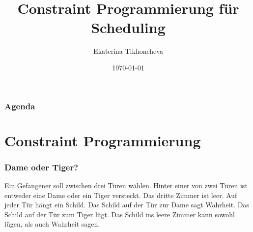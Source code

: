 \documentclass[hyperref={pdfpagelabels=false}]{beamer}
\title{Constraint Programmierung für Scheduling}
\author{Ekaterina Tikhoncheva}
\date{\today}
\newcommand{\inhalt}{\frame{   \frametitle{Überblick}   \tableofcontents[currentsection]}}
\begin{document}
\begin{frame}
\titlepage
\end{frame}
\begin{frame}
\frametitle{Agenda}
\tableofcontents
\end{frame} 


\section{Constraint Programmierung}
\inhalt

\begin{frame}
\frametitle{Dame oder Tiger?}
\small
\pause
Ein Gefangener soll zwischen {\color{darkred} drei Türen} wählen. Hinter einer von zwei Türen ist entweder {\color{darkred} eine Dame} oder {\color{darkred}ein Tiger} versteckt. Das dritte Zimmer ist {\color{darkred}leer}. Auf jeder Tür hängt ein Schild. Das Schild auf der Tür zur Dame sagt Wahrheit. Das Schild auf der Tür zum Tiger lügt. Das Schild ins leere Zimmer kann sowohl lügen, als auch Wahrheit sagen.

\vspace{10pt}
  
\end{frame}
\end{document}
